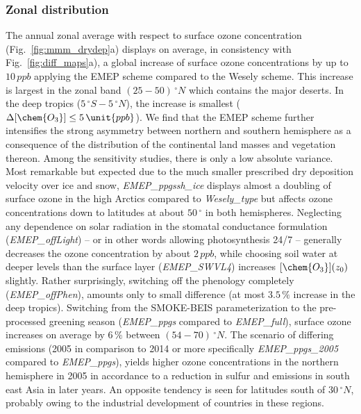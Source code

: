 \documentclass[gmd, manuscript]{copernicus}
\begin{document}
\subsubsection{Zonal distribution}
\label{subsubsec:zonal}
%
The annual zonal average with respect to surface ozone concentration (Fig.~\ref{fig:mmm_drydep}a) displays on average, in consistency with Fig.~\ref{fig:diff_maps}a), a global increase of surface ozone concentrations by up to $10\,\unit{ppb}$ applying the EMEP scheme compared to the Wesely scheme. This increase is largest in the zonal band $(25-50)\,\unit{^\circ N}$ which contains the major deserts. In the deep tropics ($5\,\unit{^\circ S}-5\,\unit{^\circ N}$), the increase is smallest ($\Delta[\chem{O_3}]\leq 5\,\unit{ppb}$). We find that the EMEP scheme further intensifies the strong asymmetry between northern and southern hemisphere as a consequence of the distribution of the continental land masses and vegetation thereon. Among the sensitivity studies, there is only a low absolute variance. Most remarkable but expected due to the much smaller prescribed dry deposition velocity over ice and snow, \emph{EMEP\_ppgssh\_ice} displays almost a doubling of surface ozone in the high Arctics compared to \emph{Wesely\_type} but affects ozone concentrations down to latitudes at about $50\,\unit{^\circ}$ in both hemispheres. Neglecting any dependence on solar radiation in the stomatal conductance formulation (\emph{EMEP\_offLight}) -- or in other words allowing photosynthesis 24/7 -- generally decreases the ozone concentration by about $2\,\unit{ppb}$, while choosing soil water at deeper levels than the surface layer (\emph{EMEP\_SWVL4}) increases $[\chem{O_3}](z_0)$ slightly. Rather surprisingly, switching off the phenology completely (\emph{EMEP\_offPhen}), amounts only to small difference (at most $3.5\,\unit{\%}$ increase in the deep tropics). Switching from the SMOKE-BEIS parameterization to the pre-processed greening season (\emph{EMEP\_ppgs} compared to \emph{EMEP\_full}), surface ozone increases on average by $6\,\unit{\%}$ between $(54-70)\,\unit{^\circ N}$. The scenario of differing emissions (2005 in comparison to 2014 or more specifically \emph{EMEP\_ppgs\_2005} compared to \emph{EMEP\_ppgs}), yields higher ozone concentrations in the northern hemisphere in 2005 in accordance to a reduction in sulfur and  emissions in south east Asia in later years. An opposite tendency is seen for latitudes south of $30\,\unit{^\circ N}$, probably owing to the industrial development of countries in these regions. 
\end{document}
